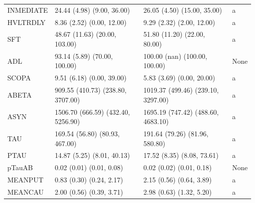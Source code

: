 \documentclass[1pt]{article}
\begin{document}
\begin{tabular}{llll}
	INMEDIATE &         24.44 (4.98) (9.00, 36.00) &        26.05 (4.50) (15.00, 35.00) &        a \\
	HVLTRDLY &          8.36 (2.52) (0.00, 12.00) &          9.29 (2.32) (2.00, 12.00) &        a \\
	SFT &      48.67 (11.63) (20.00, 103.00) &       51.80 (11.20) (22.00, 80.00) &        a \\
	ADL &       93.14 (5.89) (70.00, 100.00) &      100.00 (nan) (100.00, 100.00) &     None \\
	SCOPA &          9.51 (6.18) (0.00, 39.00) &          5.83 (3.69) (0.00, 20.00) &        a \\
	ABETA &  909.55 (410.73) (238.80, 3707.00) & 1019.37 (499.46) (239.10, 3297.00) &        a \\
	ASYN & 1506.70 (666.59) (432.40, 5256.90) & 1695.19 (747.42) (488.60, 4683.10) &        a \\
	TAU &     169.54 (56.80) (80.93, 467.00) &     191.64 (79.26) (81.96, 580.80) &        a \\
	PTAU &         14.87 (5.25) (8.01, 40.13) &         17.52 (8.35) (8.08, 73.61) &        a \\
	pTauAB &           0.02 (0.01) (0.01, 0.08) &           0.02 (0.02) (0.01, 0.18) &     None \\
	MEANPUT &           0.83 (0.30) (0.24, 2.17) &           2.15 (0.56) (0.64, 3.89) &        a \\
	MEANCAU &           2.00 (0.56) (0.39, 3.71) &           2.98 (0.63) (1.32, 5.20) &        a \\
	\bottomrule
\end{tabular}
\end{document}
